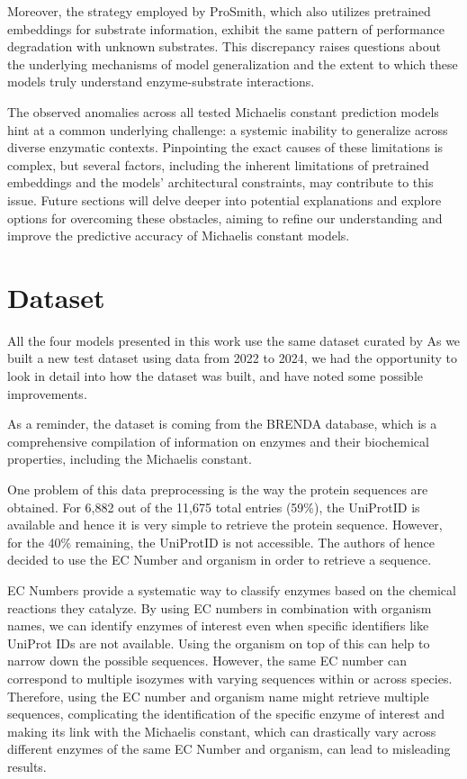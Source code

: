 Moreover, the strategy employed by ProSmith, which also utilizes pretrained embeddings for substrate information, exhibit the same pattern of performance degradation with unknown substrates. This discrepancy raises questions about the underlying mechanisms of model generalization and the extent to which these models truly understand enzyme-substrate interactions.

The observed anomalies across all tested Michaelis constant prediction models hint at a common underlying challenge: a systemic inability to generalize across diverse enzymatic contexts. Pinpointing the exact causes of these limitations is complex, but several factors, including the inherent limitations of pretrained embeddings and the models' architectural constraints, may contribute to this issue. Future sections will delve deeper into potential explanations and explore options for overcoming these obstacles, aiming to refine our understanding and improve the predictive accuracy of Michaelis constant models.

\section{Dataset}

All the four models presented in this work use the same dataset curated by \citeauthor{km1} As we 
built a new test dataset using data from 2022 to 2024, we had the opportunity to look in detail into how the dataset was built, and have noted some possible improvements.

As a reminder, the dataset is coming from the BRENDA database, which is a comprehensive compilation of information on enzymes and their biochemical properties, including the Michaelis constant.

One problem of this data preprocessing is the way the protein sequences are obtained. For 6,882 out of the
11,675 total entries (59\%), the UniProtID is available and hence it is very simple to retrieve the protein sequence. However, for the 40\% remaining, the UniProtID is not accessible. The authors of \citeauthor{km1} hence decided to use the EC Number and organism in order to retrieve a sequence.

EC Numbers provide a systematic way to classify enzymes based on the chemical reactions they catalyze. 
By using EC numbers in combination with organism names, we can identify enzymes of interest even when 
specific identifiers like UniProt IDs are not available. Using the organism on top of this can help to narrow down the possible sequences. However, the same EC number can correspond to multiple isozymes with varying sequences within or across species. Therefore, using the EC number and organism name might retrieve multiple sequences, complicating the identification of the specific enzyme of interest and making its link with the Michaelis constant, which can drastically vary across different enzymes of the same EC Number and organism, can lead to misleading results.

